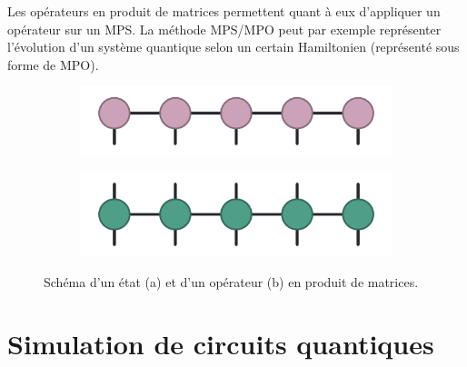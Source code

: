 Les opérateurs en produit de matrices permettent quant à eux d'appliquer un opérateur sur un MPS. La méthode MPS/MPO peut par exemple représenter l'évolution d'un système quantique selon un certain Hamiltonien (représenté sous forme de MPO).

\begin{figure}[h!]
    \centering
    \begin{subfigure}[h]{0.7\textwidth}
        \centering
        \caption{}
        \includegraphics[width=1\textwidth]{figures/mps.pdf}
        \label{fig:vqcount-circuit-a}
    \end{subfigure}
    \begin{subfigure}[h]{0.7\textwidth}
        \centering
        \caption{}
        \includegraphics[width=1\textwidth]{figures/mpo.pdf}
        \label{fig:vqcount-circuit-b}
    \end{subfigure}
    \caption[État et opérateur en produit de matrices]{Schéma d'un état (a) et d'un opérateur (b) en produit de matrices.}
\end{figure}



\section{Simulation de circuits quantiques}
\label{sec:simulation-de-circuits-quantiques}

